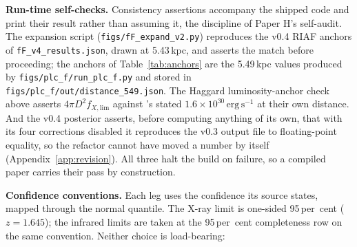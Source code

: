 \documentclass[11pt]{article}
\begin{document}
\textbf{Run-time self-checks.} Consistency assertions accompany the shipped code and print their result rather than assuming it, the discipline of Paper H's self-audit. The expansion script (\texttt{figs/fF\_expand\_v2.py}) reproduces the v0.4 RIAF anchors of \texttt{fF\_v4\_results.json}, drawn at 5.43\,kpc, and asserts the match before proceeding; the anchors of Table~\ref{tab:anchors} are the 5.49\,kpc values produced by \texttt{figs/plc\_f/run\_plc\_f.py} and stored in \texttt{figs/plc\_f/out/distance\_549.json}. The Haggard luminosity-anchor check above asserts $4\pi D^{2} f_{X,\mathrm{lim}}$ against \citeauthor{Haggard2013}'s stated $1.6\times10^{30}\,\mathrm{erg\,s^{-1}}$ at their own distance. And the v0.4 posterior asserts, before computing anything of its own, that with its four corrections disabled it reproduces the v0.3 output file to floating-point equality, so the refactor cannot have moved a number by itself (Appendix~\ref{app:revision}). All three halt the build on failure, so a compiled paper carries their pass by construction.

\textbf{Confidence conventions.} Each leg uses the confidence its source states, mapped through the normal quantile. The X-ray limit is one-sided 95\,per~cent ($z = 1.645$); the infrared limits are taken at the 95\,per~cent completeness row on the same convention. Neither choice is load-bearing:
\end{document}
